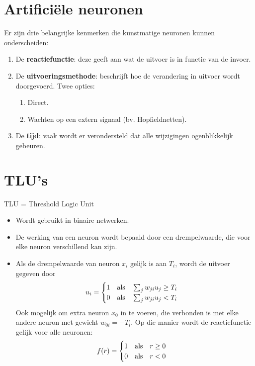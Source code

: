\section{Artificiële neuronen}
Er zijn drie belangrijke kenmerken die kunstmatige neuronen kunnen onderscheiden:
\begin{enumerate}
    \item De \textbf{reactiefunctie}: deze geeft aan wat de uitvoer is in functie van de invoer.
    \item De \textbf{uitvoeringsmethode}: beschrijft hoe de verandering in uitvoer wordt doorgevoerd. Twee opties:
    \begin{enumerate}
        \item Direct.
        \item Wachten op een extern signaal (bv. Hopfieldnetten).
    \end{enumerate}
    \item De \textbf{tijd}: vaak wordt er verondersteld dat alle wijzigingen ogenblikkelijk gebeuren.
\end{enumerate}

\section{TLU's}
TLU = Threshold Logic Unit

\begin{itemize}
    \item Wordt gebruikt in binaire netwerken.
    \item De werking van een neuron wordt bepaald door een drempelwaarde, die voor elke neuron verschillend kan zijn.
    \item Als de drempelwaarde van neuron $x_i$ gelijk is aan $T_i$, wordt de uitvoer gegeven door
    $$u_i = \begin{cases}
        1 \quad \hbox{als}\quad \sum_jw_{ji}u_j \geq T_i \\
        0 \quad \hbox{als}\quad \sum_jw_{ji}u_j < T_i
    \end{cases}$$
    \alert Ook mogelijk om extra neuron $x_0$ in te voeren, die verbonden is met elke andere neuron met gewicht $w_{0i} = -T_i$. Op die manier wordt de reactiefunctie gelijk voor alle neuronen:
    $$f(r) = \begin{cases}
        1 \quad \hbox{als}\quad r \geq 0 \\
        0 \quad \hbox{als}\quad r < 0
    \end{cases}$$
\end{itemize}

